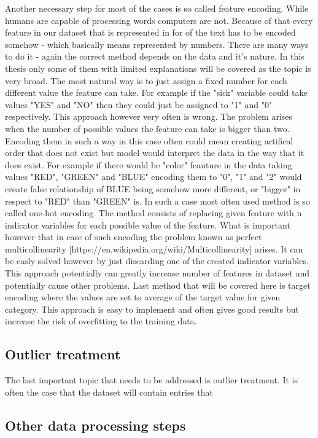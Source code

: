 \documentclass[a4paper,twoside,12pt]{book}
\begin{document}
Another necessary step for most of the cases is so called feature encoding. While humans are capable of processing words computers are not. Because of that every feature in our dataset that is represented in for of the text has to be encoded somehow - which basically means represented by numbers.
There are many ways to do it - again the correct method depends on the data and it's nature. 
In this thesis only some of them with limited explanations will be covered as the topic is very broad.
The most natural way is to just assign a fixed number for each different value the feature can take. For example if the "sick" variable could take values "YES" and "NO" then they could just be assigned to "1" and "0" respectively. This approach however very often is wrong. The problem arises when the number of possible values the feature can take is bigger than two. Encoding them in such a way in this case often could mean creating artifical order that does not exist but model would interpret the data in the way that it does exist. For example if there would be "color" feauture in the data taking values "RED", "GREEN" and "BLUE" encoding them to "0", "1" and "2" would create false relationship of BLUE being somehow more different, or "bigger" in respect to "RED" than "GREEN" is.
In such a case most often used method is so called one-hot encoding. 
The method consists of replacing given feature with n indicator variables for each possible value of the feature. What is important however that in case of such encoding the problem known as perfect multicollinearity [https://en.wikipedia.org/wiki/Multicollinearity] arises. It can be easly solved however by just discarding one of the created indicator variables. This approach potentially can greatly increase number of features in dataset and potentially cause other problems.
Last method that will be covered here is target encoding where the values are set to average of the target value for given category. This approach is easy to implement and often gives good results but increase the risk of overfitting to the training data.

\subsection{Outlier treatment}

The last important topic that needs to be addressed is outlier treatment. It is often the case that the dataset will contain entries that 


\subsection{Other data processing steps}
\end{document}
